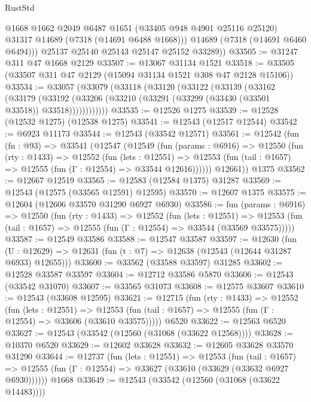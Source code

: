 \begin{lexlean}{RustStd}
\begin{coremodule}
            @1668
            @1662
            @2049
            @6487
            @1651
            (@33405 @948 @4901 @25116 @25120)
            @31317
            @14689
            (@7318 (@14691 @6488 @1668)))
          @14689
          (@7318 (@14691 @6460 @6494)))
        @25137
        @25140
        @25143
        @25147
        @25152
        @33289))
@33505 := @31247 @311 @47 @1668 @2129
@33507 := @13067 @31134 @1521
@33518 := @33505 (@33507 @311 @47 @2129 (@15094 @31134 @1521 @308 @47 @2128 @15106))
@33534 := @33057
    (@33079
      (@33118
        (@33120
          (@33122
            (@33139
              (@33162
                (@33179
                  (@33192
                    (@33206 (@33210 (@33291 (@33299 (@33430 (@33501 @33518)) @33518))))))))))))
@33535 := @12526 @1275
@33539 := @12528 (@12532 @1275) (@12538 @1275)
@33541 := @12543 (@12517 @12544)
@33542 := @6923 @11173
@33544 := @12543 (@33542 @12571)
@33561 := @12542
    (fun (fn : @93) =>
    @33541
      (@12547
        (@12549
          (fun (params : @6916) =>
          @12550
            (fun (rty : @1433) =>
            @12552
              (fun (lets : @12551) =>
              @12553 (fun (tail : @1657) => @12555 (fun (Γ : @12554) => @33544 @12616))))))
        @12661))
    @1375
@33562 := @12667 @12519
@33565 := @12583 (@12584 @1375) @31287
@33569 := @12543 (@12575 (@33565 @12591) @12595)
@33570 := @12607 @1375
@33575 := @12604 (@12606 @33570 @31290 @6927 @6930)
@33586 := fun (params : @6916) =>
  @12550
    (fun (rty : @1433) =>
    @12552
      (fun (lets : @12551) =>
      @12553 (fun (tail : @1657) => @12555 (fun (Γ : @12554) => @33544 (@33569 @33575)))))
@33587 := @12549 @33586
@33588 := @12547 @33587
@33597 := @12630
    (fun (U : @12629) => @12631 (fun (t : @7) => @12638 (@12543 (@12644 @31287 @6933) @12655)))
@33600 := @33562 (@33588 @33597) @31285
@33602 := @12528 @33587 @33597
@33604 := @12712 @33586 @5870
@33606 := @12543 (@33542 @31070)
@33607 := @33565 @31073
@33608 := @12575 @33607
@33610 := @12543 (@33608 @12595)
@33621 := @12715
    (fun (rty : @1433) =>
    @12552
      (fun (lets : @12551) =>
      @12553 (fun (tail : @1657) => @12555 (fun (Γ : @12554) => @33606 (@33610 @33575)))))
    @6520
@33622 := @12563 @6520
@33627 := @12543 (@33542 (@12560 (@31068 (@33622 @12568))))
@33628 := @10370 @6520
@33629 := @12602 @33628
@33632 := @12605 @33628 @33570 @31290
@33644 := @12737
    (fun (lets : @12551) =>
    @12553
      (fun (tail : @1657) =>
      @12555 (fun (Γ : @12554) => @33627 (@33610 (@33629 (@33632 @6927 @6930))))))
    @1668
@33649 := @12543 (@33542 (@12560 (@31068 (@33622 @14483))))

\end{coremodule}
\end{lexlean}
